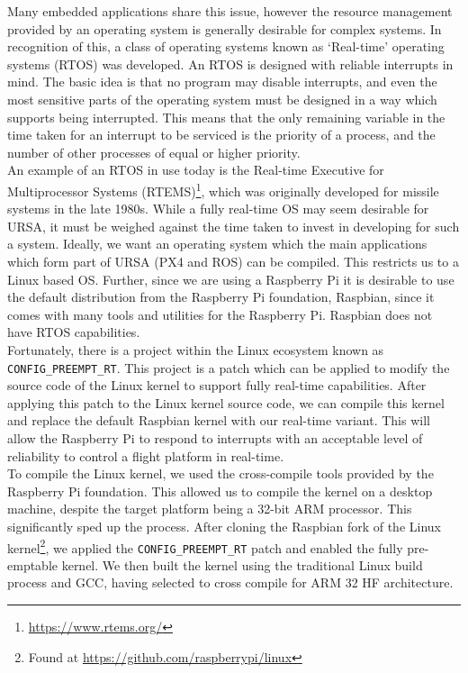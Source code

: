 \documentclass[capstone_report.tex]{subfiles}
\begin{document}
    Many embedded applications share this issue, however the resource management provided by an operating system is generally desirable for complex systems. In recognition of this, a class of operating systems known as `Real-time' operating systems (RTOS) was developed. An RTOS is designed with reliable interrupts in mind. The basic idea is that no program may disable interrupts, and even the most sensitive parts of the operating system must be designed in a way which supports being interrupted. This means that the only remaining variable in the time taken for an interrupt to be serviced is the priority of a process, and the number of other processes of equal or higher priority.\\

    An example of an RTOS in use today is the Real-time Executive for Multiprocessor Systems (RTEMS)\footnote{\url{https://www.rtems.org/}}, which was originally developed for missile systems in the late 1980s. While a fully real-time OS may seem desirable for URSA, it must be weighed against the time taken to invest in developing for such a system. Ideally, we want an operating system which the main applications which form part of URSA (PX4 and ROS) can be compiled. This restricts us to a Linux based OS. Further, since we are using a Raspberry Pi it is desirable to use the default distribution from the Raspberry Pi foundation, Raspbian, since it comes with many tools and utilities for the Raspberry Pi. Raspbian does not have RTOS capabilities.\\

    Fortunately, there is a project within the Linux ecosystem known as \texttt{CONFIG\_PREEMPT\_RT}. This project is a patch which can be applied to modify the source code of the Linux kernel to support fully real-time capabilities. After applying this patch to the Linux kernel source code, we can compile this kernel and replace the default Raspbian kernel with our real-time variant. This will allow the Raspberry Pi to respond to interrupts with an acceptable level of reliability to control a flight platform in real-time.\\

    To compile the Linux kernel, we used the cross-compile tools provided by the Raspberry Pi foundation. This allowed us to compile the kernel on a desktop machine, despite the target platform being a 32-bit ARM processor. This significantly sped up the process. After cloning the Raspbian fork of the Linux kernel\footnote{Found at \url{https://github.com/raspberrypi/linux}}, we applied the \texttt{CONFIG\_PREEMPT\_RT} patch and enabled the fully pre-emptable kernel. We then built the kernel using the traditional Linux build process and GCC, having selected to cross compile for ARM 32 HF architecture.\\
\end{document}

